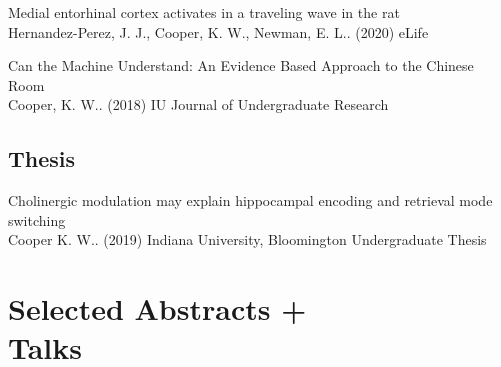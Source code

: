 \documentclass[10pt]{cooperCV2}
\begin{document}
\begin{etaremune}[resume,itemindent=-1.5\bibhang, topsep=0pt,
				   itemsep=\bibsep,partopsep=0pt,parsep=0pt,leftmargin={\bibhang+\widthof{[999]}}]
	
    \item Medial entorhinal cortex activates in a traveling wave in the rat \\
     Hernandez-Perez, J. J., Cooper, K. W., Newman, E. L.. (2020) eLife 
     
	
    \item Can the Machine Understand: An Evidence Based Approach to the Chinese Room \\
     Cooper, K. W.. (2018) IU Journal of Undergraduate Research 
     
	

\end{etaremune}

 

	

\subsection{Thesis} 
\begin{etaremune}[resume,itemindent=-1.5\bibhang, topsep=0pt,
				   itemsep=\bibsep,partopsep=0pt,parsep=0pt,leftmargin={\bibhang+\widthof{[999]}}] 
    
    \item Cholinergic modulation may explain hippocampal encoding and retrieval mode switching \\
     Cooper K. W.. (2019) Indiana University, Bloomington Undergraduate Thesis 
     
	

\end{etaremune}





















\section{Selected Abstracts +  \\Talks}
\end{document}
